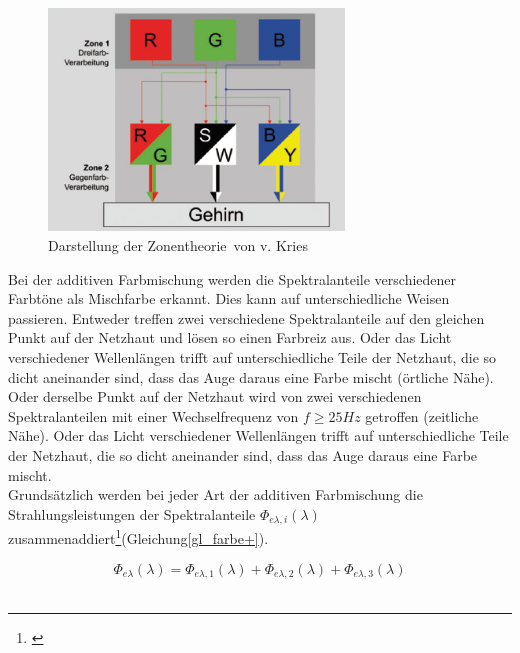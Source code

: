  
\begin{figure}[H]     %
\centering
\includegraphics[width=0.7\textwidth]{bilder/zonen} 
\caption {Darstellung der \glqq Zonentheorie\grqq\ von v. Kries \protect\footnotemark}\label{b_zonen}
\end{figure}


Bei der additiven Farbmischung werden die Spektralanteile verschiedener Farbtöne als Mischfarbe erkannt. Dies kann auf unterschiedliche Weisen passieren. Entweder treffen zwei verschiedene Spektralanteile auf den gleichen Punkt auf der Netzhaut und lösen so einen Farbreiz aus. Oder das Licht verschiedener Wellenlängen trifft auf unterschiedliche Teile der Netzhaut, die so dicht aneinander sind, dass das Auge daraus eine Farbe mischt (örtliche Nähe). Oder derselbe Punkt auf der Netzhaut wird von zwei verschiedenen Spektralanteilen mit einer Wechselfrequenz von $f\geq25Hz$ getroffen (zeitliche Nähe). Oder das Licht verschiedener Wellenlängen trifft auf unterschiedliche Teile der Netzhaut, die so dicht aneinander sind, dass das Auge daraus eine Farbe mischt.\\
Grundsätzlich werden bei jeder Art der additiven Farbmischung die Strahlungsleistungen der Spektralanteile $\Phi_{e\lambda,i}(\lambda)$ zusammenaddiert\footnote{\cite[83]{greule}}(Gleichung\ref{gl_farbe+}).

	\begin{equation}\label{gl_farbe+}
		\Phi_{e\lambda}(\lambda) = \Phi_{e\lambda,1}(\lambda) + \Phi_{e\lambda,2}(\lambda) + \Phi_{e\lambda,3}(\lambda)
	\end{equation}\\


